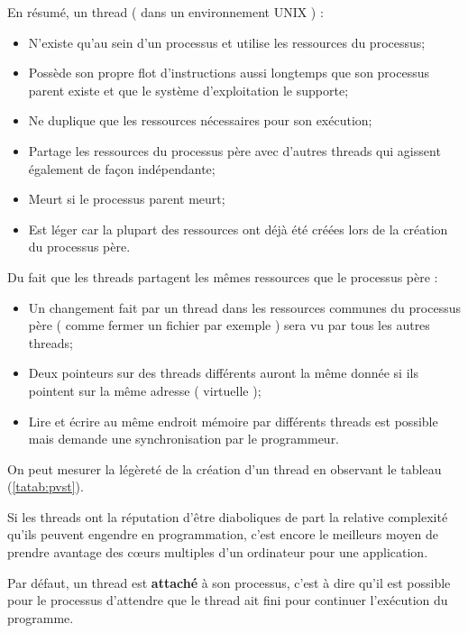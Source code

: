 \documentclass[fleqn,11pt]{article}
\begin{document}
En résumé, un thread ( dans un environnement UNIX ) :
\begin{itemize}
 \item N'existe qu'au sein d'un processus et utilise les ressources du processus;
 \item Possède son propre flot d'instructions aussi longtemps que son processus parent
       existe et que le système d'exploitation le supporte;
 \item Ne duplique que les ressources nécessaires pour son exécution;
 \item Partage les ressources du processus père avec d'autres threads qui agissent également de
 façon indépendante;
 \item Meurt si le processus parent meurt;
 \item Est léger car la plupart des ressources ont déjà été créées lors de la création du processus père.
\end{itemize}

Du fait que les threads partagent les mêmes ressources que le processus père :
\begin{itemize}
 \item Un changement fait par un thread dans les ressources communes du processus père ( comme fermer un fichier 
 par exemple ) sera vu par tous les autres threads;
 \item Deux pointeurs sur des threads différents auront la même donnée si ils pointent sur la même adresse ( virtuelle );
 \item Lire et écrire au même endroit mémoire par différents threads est possible mais demande une synchronisation par le programmeur.
\end{itemize}

On peut mesurer la légèreté de la création d'un thread en observant le tableau (\ref{tatab:pvst}).

Si les threads ont la réputation d'être diaboliques de part la relative complexité
qu'ils peuvent engendre en programmation, c'est encore le meilleurs moyen de prendre
avantage des c{\oe}urs multiples d'un ordinateur pour une application.

Par défaut, un thread est \textbf{attaché} à son processus, c'est à dire qu'il est
possible pour le processus d'attendre que le thread ait fini pour continuer
l'exécution du programme.
\end{document}
